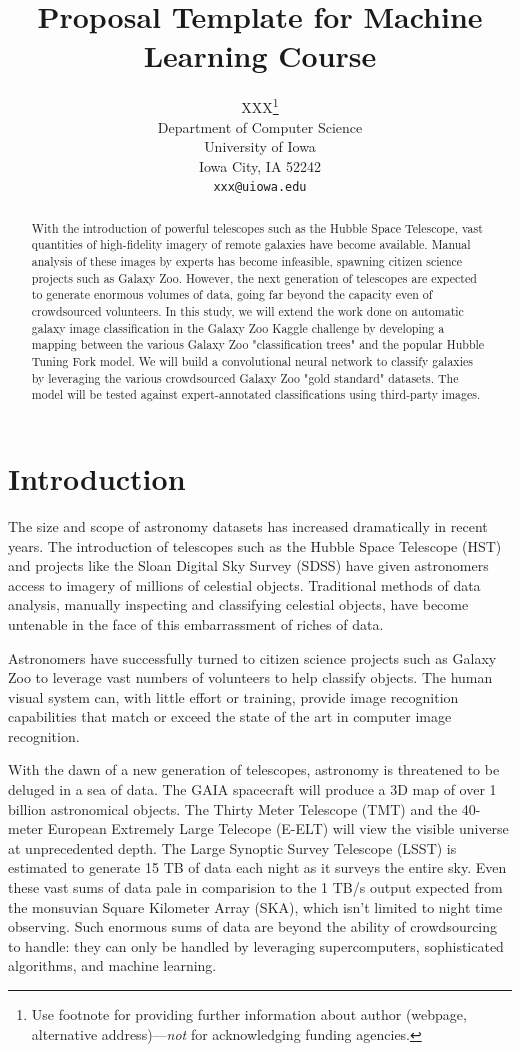 \documentclass{article}
\title{Proposal Template for Machine Learning Course}
\author{
  XXX\thanks{Use footnote for providing further
    information about author (webpage, alternative
    address)---\emph{not} for acknowledging funding agencies.} \\
  Department of Computer Science\\
  University of Iowa\\
  Iowa City, IA  52242 \\
  \texttt{xxx@uiowa.edu} \\
}
\begin{document}

\maketitle

\begin{abstract}
With the introduction of powerful telescopes such as the Hubble Space Telescope, vast quantities of high-fidelity imagery of remote galaxies have become available. Manual analysis of these images by experts has become infeasible, spawning citizen science projects such as Galaxy Zoo. However, the next generation of telescopes are expected to generate enormous volumes of data, going far beyond the capacity even of crowdsourced volunteers. In this study, we will extend the work done on automatic galaxy image classification in the Galaxy Zoo Kaggle challenge by developing a mapping between the various Galaxy Zoo "classification trees" and the popular Hubble Tuning Fork model. We will build a convolutional neural network to classify galaxies by leveraging the various crowdsourced Galaxy Zoo "gold standard" datasets. The model will be tested against expert-annotated classifications using third-party images.
\end{abstract}

\section{Introduction}
The size and scope of astronomy datasets has increased dramatically in recent years. The introduction of telescopes such as the Hubble Space Telescope (HST) and projects like the Sloan Digital Sky Survey (SDSS) have given astronomers access to imagery of millions of celestial objects. Traditional methods of data analysis, manually inspecting and classifying celestial objects, have become untenable in the face of this embarrassment of riches of data. 

Astronomers have successfully turned to citizen science projects such as Galaxy Zoo to leverage vast numbers of volunteers to help classify objects. The human visual system can, with little effort or training, provide image recognition capabilities that match or exceed the state of the art in computer image recognition. 

With the dawn of a new generation of telescopes, astronomy is threatened to be deluged in a sea of data. The GAIA spacecraft will produce a 3D map of over 1 billion astronomical objects. The Thirty Meter Telescope (TMT) and the 40-meter European Extremely Large Telecope (E-ELT) will view the visible universe at unprecedented depth. The Large Synoptic Survey Telescope (LSST) is estimated to generate 15 TB of data each night as it surveys the entire sky. Even these vast sums of data pale in comparision to the 1 TB/s output expected from the monsuvian Square Kilometer Array (SKA), which isn't limited to night time observing. Such enormous sums of data are beyond the ability of crowdsourcing to handle: they can only be handled by leveraging supercomputers, sophisticated algorithms, and machine learning.
\end{document}
